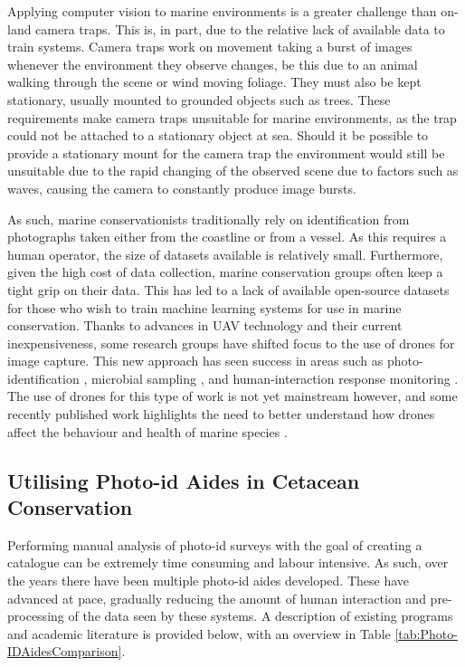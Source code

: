 Applying computer vision to marine environments is a greater challenge than on-land camera traps. This is, in part, due to the relative lack of available data to train systems. Camera traps work on movement taking a burst of images whenever the environment they observe changes, be this due to an animal walking through the scene or wind moving foliage. They must also be kept stationary, usually mounted to grounded objects such as trees. These requirements make camera traps unsuitable for marine environments, as the trap could not be attached to a stationary object at sea. Should it be possible to provide a stationary mount for the camera trap the environment would still be unsuitable due to the rapid changing of the observed scene due to factors such as waves, causing the camera to constantly produce image bursts. 

As such, marine conservationists traditionally rely on identification from photographs taken either from the coastline or from a vessel. As this requires a human operator, the size of datasets available is relatively small. Furthermore, given the high cost of data collection, marine conservation groups often keep a tight grip on their data. This has led to a lack of available open-source datasets for those who wish to train machine learning systems for use in marine conservation. Thanks to advances in UAV technology and their current inexpensiveness, some research groups have shifted focus to the use of drones for image capture. This new approach has seen success in areas such as photo-identification \cite{bogucki_applying_2019, gray_drones_2019}, microbial sampling \cite{centelleghe_use_2020}, and human-interaction response monitoring \cite{fiori_using_2020}. The use of drones for this type of work is not yet mainstream however, and some recently published work highlights the need to better understand how drones affect the behaviour and health of marine species \cite{giles_responses_2020, bevan_measuring_2018, ramos_bottlenose_2018, pomeroy_assessing_2015}. 

\subsection{Utilising Photo-id Aides in Cetacean Conservation}\label{ch:Background,sec:conTech,sub:photoIDAides}

Performing manual analysis of photo-id surveys with the goal of creating a catalogue can be extremely time consuming and labour intensive. As such, over the years there have been multiple photo-id aides developed. These have advanced at pace, gradually reducing the amount of human interaction and pre-processing of the data seen by these systems. A description of existing programs and academic literature is provided below, with an overview in Table \ref{tab:Photo-IDAidesComparison}.

